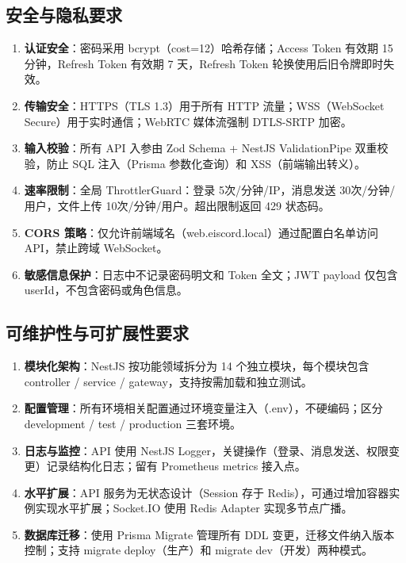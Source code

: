 \subsection{安全与隐私要求}

\begin{enumerate}[itemsep=0pt]
  \item \textbf{认证安全}：密码采用 bcrypt（cost=12）哈希存储；Access Token 有效期 15 分钟，Refresh Token 有效期 7 天，Refresh Token 轮换使用后旧令牌即时失效。
  \item \textbf{传输安全}：HTTPS（TLS 1.3）用于所有 HTTP 流量；WSS（WebSocket Secure）用于实时通信；WebRTC 媒体流强制 DTLS-SRTP 加密。
  \item \textbf{输入校验}：所有 API 入参由 Zod Schema + NestJS ValidationPipe 双重校验，防止 SQL 注入（Prisma 参数化查询）和 XSS（前端输出转义）。
  \item \textbf{速率限制}：全局 ThrottlerGuard：登录 5次/分钟/IP，消息发送 30次/分钟/用户，文件上传 10次/分钟/用户。超出限制返回 429 状态码。
  \item \textbf{CORS 策略}：仅允许前端域名（web.eiscord.local）通过配置白名单访问 API，禁止跨域 WebSocket。
  \item \textbf{敏感信息保护}：日志中不记录密码明文和 Token 全文；JWT payload 仅包含 userId，不包含密码或角色信息。
\end{enumerate}

\subsection{可维护性与可扩展性要求}

\begin{enumerate}[itemsep=0pt]
  \item \textbf{模块化架构}：NestJS 按功能领域拆分为 14 个独立模块，每个模块包含 controller / service / gateway，支持按需加载和独立测试。
  \item \textbf{配置管理}：所有环境相关配置通过环境变量注入（.env），不硬编码；区分 development / test / production 三套环境。
  \item \textbf{日志与监控}：API 使用 NestJS Logger，关键操作（登录、消息发送、权限变更）记录结构化日志；留有 Prometheus metrics 接入点。
  \item \textbf{水平扩展}：API 服务为无状态设计（Session 存于 Redis），可通过增加容器实例实现水平扩展；Socket.IO 使用 Redis Adapter 实现多节点广播。
  \item \textbf{数据库迁移}：使用 Prisma Migrate 管理所有 DDL 变更，迁移文件纳入版本控制；支持 migrate deploy（生产）和 migrate dev（开发）两种模式。
\end{enumerate}

